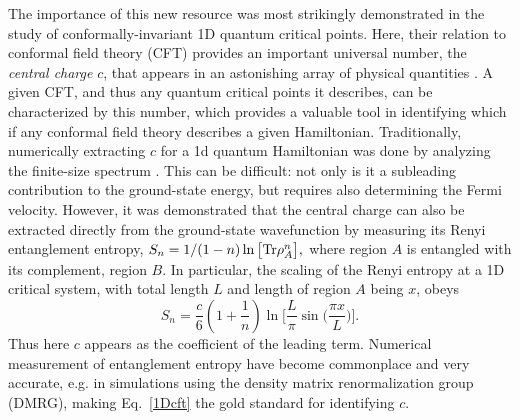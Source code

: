 \documentclass[prl,aps,twocolumn,floatfix,amsmath,amssymb,superscriptaddress,tightenlines]{revtex4}
\begin{document}
The importance of this new resource was most strikingly 
demonstrated in the study of conformally-invariant 1D quantum critical points.
Here, their relation to conformal field theory (CFT) provides an important
universal number, the {\it central charge} $c$, that appears in an astonishing array of physical
quantities \cite{Cardyubiquitous}. A given CFT, and
thus any quantum critical points it describes, can be
characterized by this number,
which provides a valuable tool in identifying which if any conformal field
theory describes a given Hamiltonian. 
Traditionally, numerically extracting $c$ for a 1d quantum
Hamiltonian was done by analyzing the finite-size spectrum
\cite{BCN,Affleck}.  This can be difficult: not only is it a
subleading contribution to the ground-state energy, but requires also
determining the Fermi velocity.
However, it was demonstrated \cite{Holzhey, VidalC} that the central charge can also be extracted 
directly from the ground-state wavefunction by measuring its Renyi
entanglement entropy, $ S_n = 1/(1-n) \ln \big[ {\rm Tr} \rho_A^n
\big], $ where region $A$ is entangled with its complement, region
$B$.  In particular, the scaling of the Renyi entropy at a 1D critical system,
with total length $L$ and length of region $A$ being $x$, obeys \cite{Korepin,Cardy}
\begin{equation}
S_n = \frac{c}{6}\left({1+ \frac{1}{n} }\right) \ln\Big[ \frac{L}{\pi} \sin\big( \frac{\pi x}{L} \big) \Big]. \label{1Dcft}
\end{equation}
Thus here $c$ appears as the coefficient of the leading
term.  
Numerical measurement of entanglement entropy have become commonplace and 
very accurate, e.g. in simulations using the density matrix renormalization group (DMRG),
making Eq.~\ref{1Dcft} the gold standard for identifying $c$.
\end{document}
